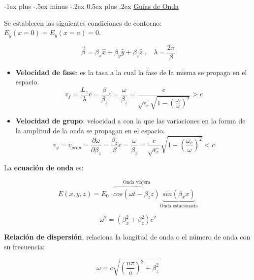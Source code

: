 \documentclass[10pt,landscape]{article}
\makeatletter
\renewcommand{\section}{\@startsection{section}{1}{0mm}%
                                {-1ex plus -.5ex minus -.2ex}%
                                {0.5ex plus .2ex}%
                                {\normalfont\large\bfseries}}
\makeatother
\begin{document}
\begin{multicols}{3}
\section{\underline{Guías de Onda}}

Se establecen las siguientes condiciones de contorno: $E_y(x = 0) = E_y(x = a) = 0$.

\begin{equation*}
	\vec{\beta} = \beta_x \hat{x} + \beta_y \hat{y} + \beta_z \hat{z} \mbox{ ,}\quad \lambda = \frac{2\pi}{\beta}
\end{equation*}

\begin{itemize}
    \item \textbf{Velocidad de fase}: es la tasa a la cual la fase de la misma se propaga en el espacio.
    	\begin{equation*}
    		v_{f} = \frac{L_z}{\lambda} c = \frac{\beta}{\beta_z}	c = \frac{\omega}{\beta_z} = \frac{c}{\sqrt{\epsilon_r} \sqrt{1 - \left( \frac{\omega_c}{\omega}\right) ^2}} > c
    	\end{equation*}

    \item \textbf{Velocidad de grupo}: velocidad a con la que las variaciones en la forma de la amplitud de la onda se propagan en el espacio.
    	\begin{equation*}
    		v_{g} = v_{prop} = \frac{\partial \omega}{\partial \beta_z} = \frac{\beta_z}{\beta}c = \frac{\omega}{\beta_z} = \frac{c}{\sqrt{\epsilon_r}} \sqrt{1 - \left( \frac{\omega_c}{\omega}\right) ^2} < c	
    	\end{equation*}
\end{itemize}

La \textbf{ecuación de onda} es:

\begin{equation*}
	E(x, y, z) = E_0 \cdot {\overbrace{cos(\omega t - \beta_z z)}^{\text{Onda viajera}}}
                         {\underbrace{sin(\beta_x x)	}}_{\text{Onda estacionaria}}	
\end{equation*}

\begin{equation*}
	\omega^2 = (\beta_x^2 + \beta_z^2) c^2
\end{equation*}


\textbf{Relación de dispersión}, relaciona la longitud de onda o el número de onda con su frecuencia:

\begin{equation*}
    \omega = c \sqrt{ \left( \frac{n \pi}{a} \right) ^2 + \beta^2_z}
\end{equation*}


\end{multicols}
\end{document}
